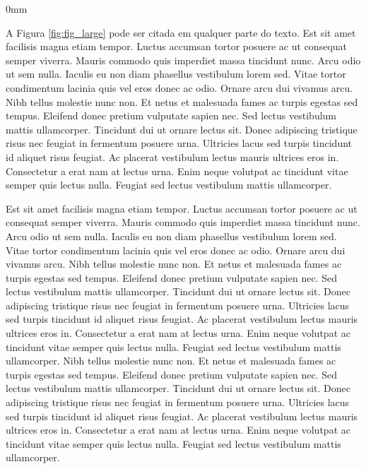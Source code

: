 \documentclass[./main.tex]{subfiles}
\begin{document}
\begin{adjustwidth}{\bodytab}{0mm}
\par A Figura \ref{fig:fig_large} pode ser citada em qualquer parte do texto. Est sit amet facilisis magna etiam tempor. Luctus accumsan tortor posuere ac ut consequat semper viverra. Mauris commodo quis imperdiet massa tincidunt nunc. Arcu odio ut sem nulla. Iaculis eu non diam phasellus vestibulum lorem sed. Vitae tortor condimentum lacinia quis vel eros donec ac odio. Ornare arcu dui vivamus arcu. Nibh tellus molestie nunc non. Et netus et malesuada fames ac turpis egestas sed tempus. Eleifend donec pretium vulputate sapien nec. Sed lectus vestibulum mattis ullamcorper. Tincidunt dui ut ornare lectus sit. Donec adipiscing tristique risus nec feugiat in fermentum posuere urna. Ultricies lacus sed turpis tincidunt id aliquet risus feugiat. Ac placerat vestibulum lectus mauris ultrices eros in. Consectetur a erat nam at lectus urna. Enim neque volutpat ac tincidunt vitae semper quis lectus nulla. Feugiat sed lectus vestibulum mattis ullamcorper.

\par Est sit amet facilisis magna etiam tempor. Luctus accumsan tortor posuere ac ut consequat semper viverra. Mauris commodo quis imperdiet massa tincidunt nunc. Arcu odio ut sem nulla. Iaculis eu non diam phasellus vestibulum lorem sed. Vitae tortor condimentum lacinia quis vel eros donec ac odio. Ornare arcu dui vivamus arcu. Nibh tellus molestie nunc non. Et netus et malesuada fames ac turpis egestas sed tempus. Eleifend donec pretium vulputate sapien nec. Sed lectus vestibulum mattis ullamcorper. Tincidunt dui ut ornare lectus sit. Donec adipiscing tristique risus nec feugiat in fermentum posuere urna. Ultricies lacus sed turpis tincidunt id aliquet risus feugiat. Ac placerat vestibulum lectus mauris ultrices eros in. Consectetur a erat nam at lectus urna. Enim neque volutpat ac tincidunt vitae semper quis lectus nulla. Feugiat sed lectus vestibulum mattis ullamcorper. Nibh tellus molestie nunc non. Et netus et malesuada fames ac turpis egestas sed tempus. Eleifend donec pretium vulputate sapien nec. Sed lectus vestibulum mattis ullamcorper. Tincidunt dui ut ornare lectus sit. Donec adipiscing tristique risus nec feugiat in fermentum posuere urna. Ultricies lacus sed turpis tincidunt id aliquet risus feugiat. Ac placerat vestibulum lectus mauris ultrices eros in. Consectetur a erat nam at lectus urna. Enim neque volutpat ac tincidunt vitae semper quis lectus nulla. Feugiat sed lectus vestibulum mattis ullamcorper.
\end{adjustwidth}
\end{document}
